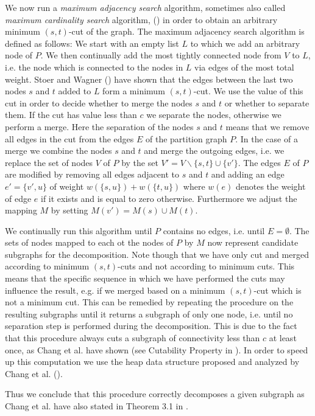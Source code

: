 \documentclass[a4paper,UKenglish,cleveref, autoref, thm-restate,authorcolumns]{lipics-v2019}
\begin{document}
We now run a \textit{maximum adjacency search} algorithm, sometimes also called \textit{maximum cardinality search} algorithm, (\cite{Stoer1997}) in order to obtain an arbitrary minimum $(s,t)$-cut of the graph.
The maximum adjacency search algorithm is defined as follows: We start with an empty list $L$ to which we add an arbitrary node of $P$. We then continually add the most tightly connected node from $V$ to $L$, i.e. the node which is connected to the nodes in $L$ via edges of the most total weight. Stoer and Wagner (\cite{Stoer1997}) have shown that the edges between the last two nodes $s$ and $t$ added to $L$ form a minimum $(s,t)$-cut.
We use the value of this cut in order to decide whether to merge the nodes $s$ and $t$ or whether to separate them. If the cut has value less than $c$ we separate the nodes, otherwise we perform a merge.
Here the separation of the nodes $s$ and $t$ means that we remove all edges in the cut from the edges $E$ of the partition graph $P$.
In the case of a merge we combine the nodes $s$ and $t$ and merge the outgoing edges, i.e. we replace the set of nodes $V$ of $P$ by the set $V'=V\backslash\{s,t\}\cup\{v'\}$. The edges $E$ of $P$ are modified by removing all edges adjacent to $s$ and $t$ and adding an edge $e'=\{v',u\}$ of weight $w(\{s,u\})+w(\{t,u\})$ where $w(e)$ denotes the weight of edge $e$ if it exists and is equal to zero otherwise.
Furthermore we adjust the mapping $M$ by setting $M(v')=M(s)\cup M(t)$.

We continually run this algorithm until $P$ contains no edges, i.e. until $E=\emptyset$. The sets of nodes mapped to each ot the nodes of $P$ by $M$ now represent candidate subgraphs for the decomposition. Note though that we have only cut and merged according to minimum $(s,t)$-cuts and not according to minimum cuts. This means that the specific sequence in which we have performed the cuts may influence the result, e.g. if we merged based on a minimum $(s,t)$-cut which is not a minimum cut.
This can be remedied by repeating the procedure on the resulting subgraphs until it returns a subgraph of only one node, i.e. until no separation step is performed during the decomposition. This is due to the fact that this procedure always cuts a subgraph of connectivity less than $c$ at least once, as Chang et al. have shown (see Cutability Property in \cite{Chang2013}).
In order to speed up this computation we use the heap data structure proposed and analyzed by Chang et al. (\cite{Chang2013}).

Thus we conclude that this procedure correctly decomposes a given subgraph as Chang et al. have also stated in Theorem 3.1 in \cite{Chang2013}.
\end{document}
